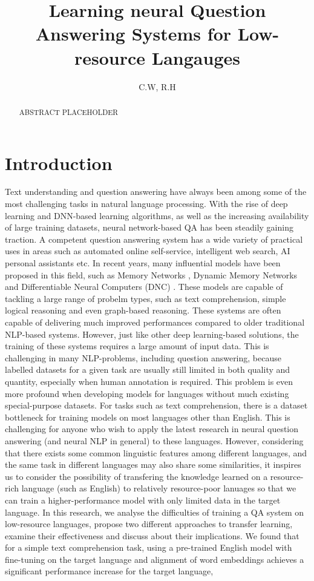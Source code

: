 \documentclass[]{article}
\title{Learning neural Question Answering Systems for Low-resource Langauges}
\author{C.W, R.H}
\begin{document}
\maketitle

\newpage
\begin{abstract}
ABSTRACT PLACEHOLDER
\end{abstract}

\newpage
\tableofcontents

\newpage
\section{Introduction}
Text understanding and question answering have always been among some of the most challenging tasks in natural language processing. With the rise of deep learning and DNN-based learning algorithms, as well as the increasing availability of large training datasets, neural network-based QA has been steadily gaining traction. A competent question answering system has a wide variety of practical uses in areas such as automated online self-service, intelligent web search, AI personal assistants etc. In recent years, many influential models have been proposed in this field, such as Memory Networks \cite{sukhbaatar2015end}, Dynamic Memory Networks \cite{kumar2016ask} and Differentiable Neural Computers (DNC) \cite{graves2016hybrid}. These models are capable of tackling a large range of probelm types, such as text comprehension, simple logical reasoning and even graph-based reasoning. These systems are often capable of delivering much improved performances compared to older traditional NLP-based systems. However, just like other deep learning-based solutions, the training of these systems requires a large amount of input data. This is challenging in many NLP-problems, including question answering, because labelled datasets for a given task are usually still limited in both quality and quantity, especially when human annotation is required. This problem is even more profound when developing models for languages without much existing special-purpose datasets. For tasks such as text comprehension, there is a dataset bottleneck for training models on most languages other than English. This is challenging for anyone who wish to apply the latest research in neural question answering (and neural NLP in general) to these languages. However, considering that there exists some common linguistic features among different languages, and the same task in different languages may also share some similarities, it inspires us to consider the possibility of transfering the knowledge learned on a resource-rich language (such as English) to relatively resource-poor lanuages so that we can train a higher-performance model with only limited data in the target language. In this research, we analyse the difficulties of training a QA system on low-resource languages, propose two different approaches to transfer learning, examine their effectiveness and discuss about their implications. We found that for a simple text comprehension task, using a pre-trained English model with fine-tuning on the target language and alignment of word embeddings achieves a significant performance increase for the target language, 
\end{document}
